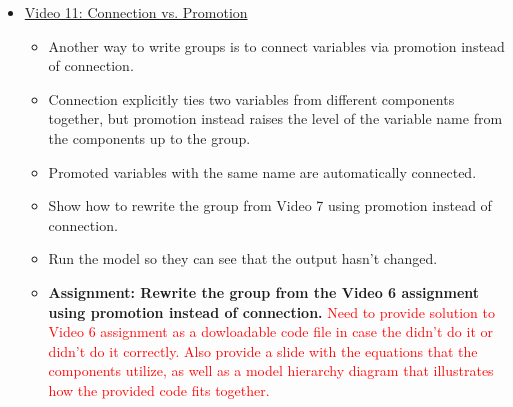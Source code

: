 \documentclass[12pt, letterpaper]{article}
\begin{document}
\begin{itemize}
	\item \underline{Video 11: Connection vs. Promotion}
		\begin{itemize}
			\item Another way to write groups is to connect variables via promotion instead of connection.
			\item Connection explicitly ties two variables from different components together, but promotion instead raises the level of the variable name from the components up to the group.
			\item Promoted variables with the same name are automatically connected.
			\item Show how to rewrite the group from Video 7 using promotion instead of connection.
			\item Run the model so they can see that the output hasn't changed.
			\item \textbf{Assignment: Rewrite the group from the Video 6 assignment using promotion instead of connection.} \textcolor{red}{Need to provide solution to Video 6 assignment as a dowloadable code file in case the didn't do it or didn't do it correctly. Also provide a slide with the equations that the components utilize, as well as a model hierarchy diagram that illustrates how the provided code fits together.}
		\end{itemize}
		

\end{itemize}
\end{document}
